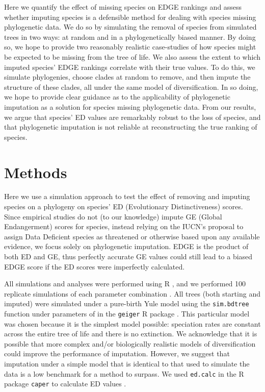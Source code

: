 \documentclass[12pt,english]{article}
\begin{document}
Here we quantify the effect of missing species on EDGE rankings and assess
whether imputing species is a defensible method for dealing with species missing
phylogenetic data. We do so by simulating the removal of species from simulated
trees in two ways: at random and in a phylogenetically biased manner. By doing
so, we hope to provide two reasonably realistic case-studies of how species
might be expected to be missing from the tree of life. We also assess the extent
to which imputed species' EDGE rankings correlate with their true values. To do
this, we simulate phylogenies, choose clades at random to remove, and then
impute the structure of these clades, all under the same model of
diversification. In so doing, we hope to provide clear guidance as to the
applicability of phylogenetic imputation as a solution for species missing
phylogenetic data. From our results, we argue that species' ED values are
remarkably robust to the loss of species, and that phylogenetic imputation is
not reliable at reconstructing the true ranking of species.

\section*{Methods}

Here we use a simulation approach to test the effect of removing and imputing
species on a phylogeny on species' ED (Evolutionary Distinctiveness) scores.
Since empirical studies do not (to our knowledge) impute GE (Global
Endangerment) scores for species, instead relying on the IUCN's proposal to
assign Data Deficient species as threatened or otherwise based upon any
available evidence, we focus solely on phylogenetic imputation. EDGE is the
product of both ED and GE, thus perfectly accurate GE values could still lead to
a biased EDGE score if the ED scores were imperfectly calculated.

All simulations and analyses were performed using R \autocite[version
3.4.0;][]{R2017}, and we performed 100 replicate simulations of each parameter
combination . All trees (both starting and imputed) were simulated under a
pure-birth Yule model using the \texttt{sim.bdtree} function under parameters of
 in the \texttt{geiger} R package \autocite{Pennell2014}. 
This particular model was chosen because it is the simplest model possible:
speciation rates are constant across the entire tree of life and there is no
extinction. We acknowledge that it is possible that more complex and/or
biologically realistic models of diversification could improve the performance
of imputation. However, we suggest that imputation under a simple model that is
identical to that used to simulate the data is a low benchmark for a method to
surpass. We used \texttt{ed.calc} in the R package \texttt{caper} to calculate
ED values \autocite{Orme2013}.
\end{document}
